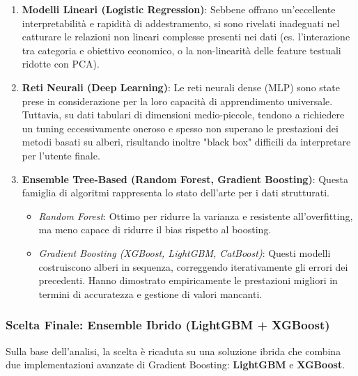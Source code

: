 \documentclass[a4paper,14pt]{extarticle}
\begin{document}
\begin{enumerate}
    \item \textbf{Modelli Lineari (Logistic Regression)}:
    Sebbene offrano un'eccellente interpretabilità e rapidità di addestramento, si sono rivelati inadeguati nel catturare le relazioni non lineari complesse presenti nei dati (es. l'interazione tra categoria e obiettivo economico, o la non-linearità delle feature testuali ridotte con PCA).
    
    \item \textbf{Reti Neurali (Deep Learning)}:
    Le reti neurali dense (MLP) sono state prese in considerazione per la loro capacità di apprendimento universale. Tuttavia, su dati tabulari di dimensioni medio-piccole, tendono a richiedere un tuning eccessivamente oneroso e spesso non superano le prestazioni dei metodi basati su alberi, risultando inoltre "black box" difficili da interpretare per l'utente finale.
    
    \item \textbf{Ensemble Tree-Based (Random Forest, Gradient Boosting)}:
    Questa famiglia di algoritmi rappresenta lo stato dell'arte per i dati strutturati.
    \begin{itemize}
        \item \textit{Random Forest}: Ottimo per ridurre la varianza e resistente all'overfitting, ma meno capace di ridurre il bias rispetto al boosting.
        \item \textit{Gradient Boosting (XGBoost, LightGBM, CatBoost)}: Questi modelli costruiscono alberi in sequenza, correggendo iterativamente gli errori dei precedenti. Hanno dimostrato empiricamente le prestazioni migliori in termini di accuratezza e gestione di valori mancanti.
    \end{itemize}
\end{enumerate}

\subsubsection{Scelta Finale: Ensemble Ibrido (LightGBM + XGBoost)}
Sulla base dell'analisi, la scelta è ricaduta su una soluzione ibrida che combina due implementazioni avanzate di Gradient Boosting: \textbf{LightGBM} e \textbf{XGBoost}.
\end{document}
